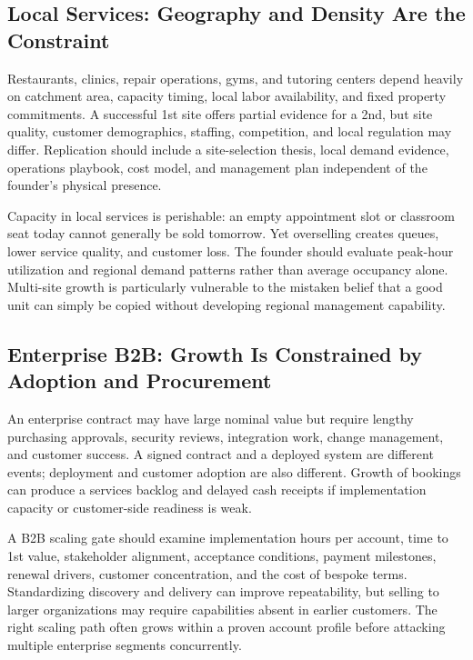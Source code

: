 \subsection{Local Services: Geography and Density Are the Constraint}
\label{sec:local_services_geography_density}

Restaurants, clinics, repair operations, gyms, and tutoring centers depend heavily on catchment area, capacity timing, local labor availability, and fixed property commitments. A successful 1st site offers partial evidence for a 2nd, but site quality, customer demographics, staffing, competition, and local regulation may differ. Replication should include a site-selection thesis, local demand evidence, operations playbook, cost model, and management plan independent of the founder's physical presence.

Capacity in local services is perishable: an empty appointment slot or classroom seat today cannot generally be sold tomorrow. Yet overselling creates queues, lower service quality, and customer loss. The founder should evaluate peak-hour utilization and regional demand patterns rather than average occupancy alone. Multi-site growth is particularly vulnerable to the mistaken belief that a good unit can simply be copied without developing regional management capability.

\subsection{Enterprise B2B: Growth Is Constrained by Adoption and Procurement}
\label{sec:enterprise_b2b_procurement_adoption}

An enterprise contract may have large nominal value but require lengthy purchasing approvals, security reviews, integration work, change management, and customer success. A signed contract and a deployed system are different events; deployment and customer adoption are also different. Growth of bookings can produce a services backlog and delayed cash receipts if implementation capacity or customer-side readiness is weak.

A B2B scaling gate should examine implementation hours per account, time to 1st value, stakeholder alignment, acceptance conditions, payment milestones, renewal drivers, customer concentration, and the cost of bespoke terms. Standardizing discovery and delivery can improve repeatability, but selling to larger organizations may require capabilities absent in earlier customers. The right scaling path often grows within a proven account profile before attacking multiple enterprise segments concurrently.

